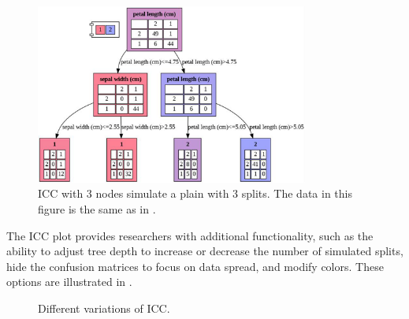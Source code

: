 \documentclass[11pt]{article}
\begin{document}
\begin{figure}[H]
\centering
\includegraphics[width=0.8\textwidth]{icc.png}

\caption{ICC with 3 nodes simulate a plain with 3 splits. The data in this figure is the same as in .}
\label{fig:fig2}

\end{figure}

The ICC plot provides researchers with additional functionality, such as the ability to adjust tree depth to increase or decrease the number of simulated splits, hide the confusion matrices to focus on data spread, and modify colors. These options are illustrated in .

\begin{figure}[H]
        	\centering
           \caption{Different variations of ICC.}
           \label{fig:fig3}
\end{figure}    
\end{document}
